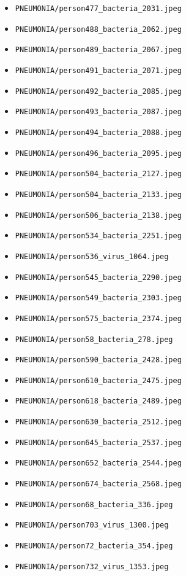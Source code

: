 \begin{itemize}
\item \texttt{PNEUMONIA/person477\_bacteria\_2031.jpeg}
\item \texttt{PNEUMONIA/person488\_bacteria\_2062.jpeg}
\item \texttt{PNEUMONIA/person489\_bacteria\_2067.jpeg}
\item \texttt{PNEUMONIA/person491\_bacteria\_2071.jpeg}
\item \texttt{PNEUMONIA/person492\_bacteria\_2085.jpeg}
\item \texttt{PNEUMONIA/person493\_bacteria\_2087.jpeg}
\item \texttt{PNEUMONIA/person494\_bacteria\_2088.jpeg}
\item \texttt{PNEUMONIA/person496\_bacteria\_2095.jpeg}
\item \texttt{PNEUMONIA/person504\_bacteria\_2127.jpeg}
\item \texttt{PNEUMONIA/person504\_bacteria\_2133.jpeg}
\item \texttt{PNEUMONIA/person506\_bacteria\_2138.jpeg}
\item \texttt{PNEUMONIA/person534\_bacteria\_2251.jpeg}
\item \texttt{PNEUMONIA/person536\_virus\_1064.jpeg}
\item \texttt{PNEUMONIA/person545\_bacteria\_2290.jpeg}
\item \texttt{PNEUMONIA/person549\_bacteria\_2303.jpeg}
\item \texttt{PNEUMONIA/person575\_bacteria\_2374.jpeg}
\item \texttt{PNEUMONIA/person58\_bacteria\_278.jpeg}
\item \texttt{PNEUMONIA/person590\_bacteria\_2428.jpeg}
\item \texttt{PNEUMONIA/person610\_bacteria\_2475.jpeg}
\item \texttt{PNEUMONIA/person618\_bacteria\_2489.jpeg}
\item \texttt{PNEUMONIA/person630\_bacteria\_2512.jpeg}
\item \texttt{PNEUMONIA/person645\_bacteria\_2537.jpeg}
\item \texttt{PNEUMONIA/person652\_bacteria\_2544.jpeg}
\item \texttt{PNEUMONIA/person674\_bacteria\_2568.jpeg}
\item \texttt{PNEUMONIA/person68\_bacteria\_336.jpeg}
\item \texttt{PNEUMONIA/person703\_virus\_1300.jpeg}
\item \texttt{PNEUMONIA/person72\_bacteria\_354.jpeg}
\item \texttt{PNEUMONIA/person732\_virus\_1353.jpeg}

\end{itemize}
